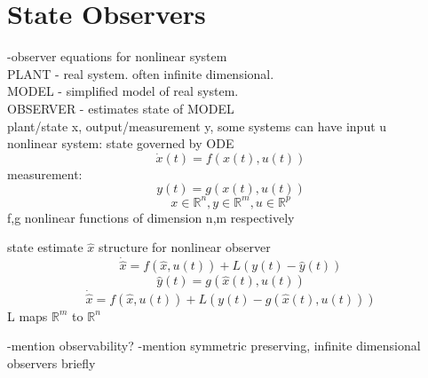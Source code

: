 \section{State Observers} \label{sec:observerequations}
-observer equations for nonlinear system\\
PLANT - real system. often infinite dimensional.\\
MODEL - simplified model of real system.\\
OBSERVER - estimates state of MODEL\\
plant/state x, output/measurement y, some systems can have input u\\
nonlinear system:
state governed by ODE
\begin{equation}
	\dot{x}(t) = f(x(t),u(t))
\end{equation}
measurement:
\begin{equation}
	y(t) = g(x(t),u(t))
\end{equation}
$$ x \in \mathbb{R}^n, y \in \mathbb{R}^m, u \in \mathbb{R}^p$$
f,g nonlinear functions of dimension n,m respectively

state estimate $\hat{x}$
structure for nonlinear observer
\begin{equation}
	\dot{\hat{x}} = f(\hat{x},u(t)) + L(y(t)-\hat{y}(t))
\end{equation}
\begin{equation}
	\hat{y}(t) = g(\hat{x}(t),u(t)) 
\end{equation}
\begin{equation}
	\dot{\hat{x}} = f(\hat{x},u(t)) + L(y(t)-g(\hat{x}(t),u(t)))
\end{equation}
L maps $\mathbb{R}^m$ to $\mathbb{R}^n$

-mention observability?
-mention symmetric preserving, infinite dimensional observers briefly
